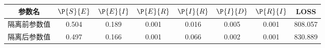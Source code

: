 \begin{tabular}{cccccccc}
\hline
参数名&$\P{S}{E}$&$\P{E}{I}$&$\P{E}{R}$&$\P{I}{R}$&$\P{I}{D}$&$\P{R}{I}$&LOSS\\
\hline
隔离前参数值&0.504&0.189&0.001&0.016&0.005&0.001&808.057\\
隔离后参数值&0.497&0.166&0.001&0.066&0.002&0.001&830.889\\
\hline
\end{tabular}